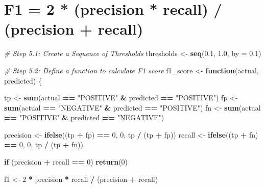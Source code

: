 \documentclass[
]{article}
\newenvironment{Shaded}{\begin{snugshade}}{\end{snugshade}}
\newcommand{\AttributeTok}[1]{\textcolor[rgb]{0.13,0.29,0.53}{#1}}
\newcommand{\CommentTok}[1]{\textcolor[rgb]{0.56,0.35,0.01}{\textit{#1}}}
\newcommand{\ControlFlowTok}[1]{\textcolor[rgb]{0.13,0.29,0.53}{\textbf{#1}}}
\newcommand{\DecValTok}[1]{\textcolor[rgb]{0.00,0.00,0.81}{#1}}
\newcommand{\FloatTok}[1]{\textcolor[rgb]{0.00,0.00,0.81}{#1}}
\newcommand{\FunctionTok}[1]{\textcolor[rgb]{0.13,0.29,0.53}{\textbf{#1}}}
\newcommand{\NormalTok}[1]{#1}
\newcommand{\OtherTok}[1]{\textcolor[rgb]{0.56,0.35,0.01}{#1}}
\newcommand{\SpecialCharTok}[1]{\textcolor[rgb]{0.81,0.36,0.00}{\textbf{#1}}}
\newcommand{\StringTok}[1]{\textcolor[rgb]{0.31,0.60,0.02}{#1}}
\begin{document}
\section{F1 = 2 * (precision * recall) / (precision +
recall)}\label{f1-2-precision-recall-precision-recall}

\begin{Shaded}
\begin{Highlighting}[]
\CommentTok{\# Step 5.1: Create a Sequence of Thresholds}
\NormalTok{thresholds }\OtherTok{\textless{}{-}} \FunctionTok{seq}\NormalTok{(}\FloatTok{0.1}\NormalTok{, }\FloatTok{1.0}\NormalTok{, }\AttributeTok{by =} \FloatTok{0.1}\NormalTok{)}

\CommentTok{\# Step 5.2: Define a function to calculate F1 score}
\NormalTok{f1\_score }\OtherTok{\textless{}{-}} \ControlFlowTok{function}\NormalTok{(actual, predicted) \{}

\NormalTok{  tp }\OtherTok{\textless{}{-}} \FunctionTok{sum}\NormalTok{(actual }\SpecialCharTok{==} \StringTok{"POSITIVE"} \SpecialCharTok{\&}\NormalTok{ predicted }\SpecialCharTok{==} \StringTok{"POSITIVE"}\NormalTok{)}
\NormalTok{  fp }\OtherTok{\textless{}{-}} \FunctionTok{sum}\NormalTok{(actual }\SpecialCharTok{==} \StringTok{"NEGATIVE"} \SpecialCharTok{\&}\NormalTok{ predicted }\SpecialCharTok{==} \StringTok{"POSITIVE"}\NormalTok{)}
\NormalTok{  fn }\OtherTok{\textless{}{-}} \FunctionTok{sum}\NormalTok{(actual }\SpecialCharTok{==} \StringTok{"POSITIVE"} \SpecialCharTok{\&}\NormalTok{ predicted }\SpecialCharTok{==} \StringTok{"NEGATIVE"}\NormalTok{)}

\NormalTok{  precision }\OtherTok{\textless{}{-}} \FunctionTok{ifelse}\NormalTok{((tp }\SpecialCharTok{+}\NormalTok{ fp) }\SpecialCharTok{==} \DecValTok{0}\NormalTok{, }\DecValTok{0}\NormalTok{, tp }\SpecialCharTok{/}\NormalTok{ (tp }\SpecialCharTok{+}\NormalTok{ fp))}
\NormalTok{  recall }\OtherTok{\textless{}{-}} \FunctionTok{ifelse}\NormalTok{((tp }\SpecialCharTok{+}\NormalTok{ fn) }\SpecialCharTok{==} \DecValTok{0}\NormalTok{, }\DecValTok{0}\NormalTok{, tp }\SpecialCharTok{/}\NormalTok{ (tp }\SpecialCharTok{+}\NormalTok{ fn))}

  \ControlFlowTok{if}\NormalTok{ (precision }\SpecialCharTok{+}\NormalTok{ recall }\SpecialCharTok{==} \DecValTok{0}\NormalTok{) }\FunctionTok{return}\NormalTok{(}\DecValTok{0}\NormalTok{)}

\NormalTok{  f1 }\OtherTok{\textless{}{-}} \DecValTok{2} \SpecialCharTok{*}\NormalTok{ precision }\SpecialCharTok{*}\NormalTok{ recall }\SpecialCharTok{/}\NormalTok{ (precision }\SpecialCharTok{+}\NormalTok{ recall)}


\end{Highlighting}
\end{Shaded}
\end{document}
